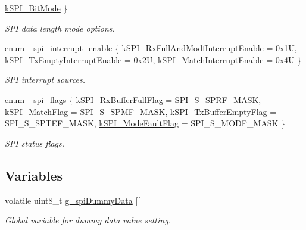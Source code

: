 \begin{DoxyCompactItemize}
\mbox{\hyperlink{group__spi__driver_gga1e6f95a831fb9323a32a9676ef049813a740c43589ebe839f3adc77b8ca484ea4}{k\+S\+P\+I\+\_\+Bit\+Mode}}
 \}
\begin{DoxyCompactList}\small\item\em S\+PI data length mode options. \end{DoxyCompactList}\item 
enum \mbox{\hyperlink{group__spi__driver_gaedd690a0f91a0a9eb0fd573b57e31f67}{\+\_\+spi\+\_\+interrupt\+\_\+enable}} \{ \mbox{\hyperlink{group__spi__driver_ggaedd690a0f91a0a9eb0fd573b57e31f67aa317b77c827ed1462b766dddd93f7f10}{k\+S\+P\+I\+\_\+\+Rx\+Full\+And\+Modf\+Interrupt\+Enable}} = 0x1U, 
\mbox{\hyperlink{group__spi__driver_ggaedd690a0f91a0a9eb0fd573b57e31f67abe157750a1660d839a66197c56ac5096}{k\+S\+P\+I\+\_\+\+Tx\+Empty\+Interrupt\+Enable}} = 0x2U, 
\mbox{\hyperlink{group__spi__driver_ggaedd690a0f91a0a9eb0fd573b57e31f67a95cc9167ada10046534dc22549c6a99e}{k\+S\+P\+I\+\_\+\+Match\+Interrupt\+Enable}} = 0x4U
 \}
\begin{DoxyCompactList}\small\item\em S\+PI interrupt sources. \end{DoxyCompactList}\item 
enum \mbox{\hyperlink{group__spi__driver_gaea776f478792865a85b7311e6ff5896c}{\+\_\+spi\+\_\+flags}} \{ \mbox{\hyperlink{group__spi__driver_ggaea776f478792865a85b7311e6ff5896cacc0e5c67e296cc20197afaca46f22953}{k\+S\+P\+I\+\_\+\+Rx\+Buffer\+Full\+Flag}} = S\+P\+I\+\_\+\+S\+\_\+\+S\+P\+R\+F\+\_\+\+M\+A\+SK, 
\mbox{\hyperlink{group__spi__driver_ggaea776f478792865a85b7311e6ff5896ca9c24fe83960ed64638f06eeb17643da5}{k\+S\+P\+I\+\_\+\+Match\+Flag}} = S\+P\+I\+\_\+\+S\+\_\+\+S\+P\+M\+F\+\_\+\+M\+A\+SK, 
\mbox{\hyperlink{group__spi__driver_ggaea776f478792865a85b7311e6ff5896ca07934a27954d951831e7cdb96c39afd7}{k\+S\+P\+I\+\_\+\+Tx\+Buffer\+Empty\+Flag}} = S\+P\+I\+\_\+\+S\+\_\+\+S\+P\+T\+E\+F\+\_\+\+M\+A\+SK, 
\mbox{\hyperlink{group__spi__driver_ggaea776f478792865a85b7311e6ff5896ca9eca4e759c879e3b264d052c234a09d1}{k\+S\+P\+I\+\_\+\+Mode\+Fault\+Flag}} = S\+P\+I\+\_\+\+S\+\_\+\+M\+O\+D\+F\+\_\+\+M\+A\+SK
 \}
\begin{DoxyCompactList}\small\item\em S\+PI status flags. \end{DoxyCompactList}\end{DoxyCompactItemize}
\subsection*{Variables}
\begin{DoxyCompactItemize}
\item 
\mbox{\label{group__spi__driver_ga2789f8e1074f19357daf2d8ece8b86ad}} 
volatile uint8\+\_\+t \mbox{\hyperlink{group__spi__driver_ga2789f8e1074f19357daf2d8ece8b86ad}{g\+\_\+spi\+Dummy\+Data}} \mbox{[}$\,$\mbox{]}
\begin{DoxyCompactList}\small\item\em Global variable for dummy data value setting. \end{DoxyCompactList}\end{DoxyCompactItemize}
